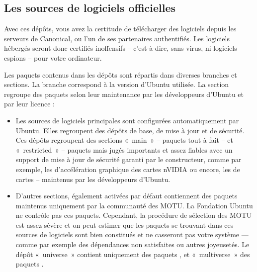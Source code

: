 \subsection{Les sources de logiciels officielles}
Avec ces dépôts, vous avez la certitude de télécharger des logiciels depuis les serveurs de Canonical, ou l'un de ses partenaires authentifiés. Les logiciels hébergés seront donc certifiés inoffensifs -- c'est-à-dire, sans virus, ni logiciels espions -- pour votre ordinateur.\par
Les paquets contenus dans les dépôts sont répartis dans diverses branches et sections. La branche correspond à la version d'Ubuntu utilisée. La section regroupe des paquets selon leur maintenance par les développeurs d'Ubuntu et par leur licence :\par
\begin{itemize}
\item Les sources de logiciels principales sont configurées automatiquement par Ubuntu. Elles regroupent des dépôts de base, de mise à jour et de sécurité. Ces dépôts regroupent des sections «~main~» -- paquets tout à fait  -- et «~restricted~» -- paquets  mais jugés importants et assez fiables avec un support de mise à jour de sécurité garanti par le constructeur, comme par exemple, les  d'accélération graphique des cartes nVIDIA ou encore, les  de cartes  -- maintenus par les développeurs d'Ubuntu.
\item D'autres sections, également activées par défaut contiennent des paquets maintenus uniquement par la communauté des MOTU. La Fondation Ubuntu ne contrôle pas ces paquets. Cependant, la procédure de sélection des MOTU est assez sévère et on peut estimer que les paquets se trouvant dans ces sources de logiciels sont bien constitués et ne casseront pas votre système --- comme par exemple des dépendances non satisfaites ou autres joyeusetés. Le dépôt «~universe~» contient uniquement des paquets , et «~multiverse~» des paquets .%
\end{itemize}
